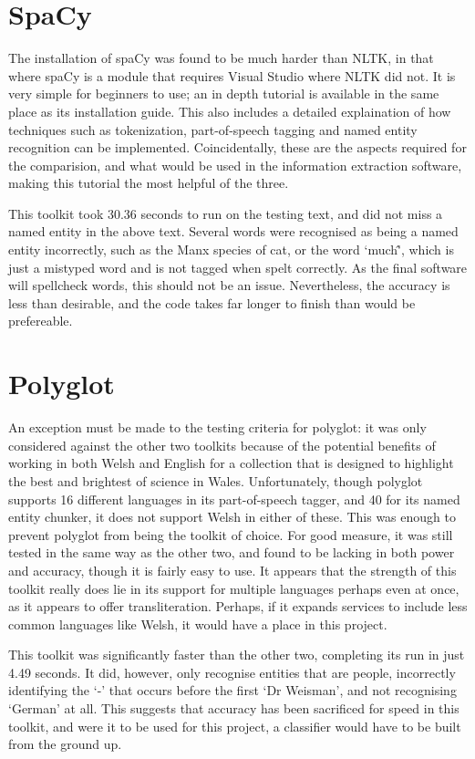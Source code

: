 \documentclass[11pt,a4paper]{article}
\begin{document}
\section{SpaCy}
The installation of spaCy was found to be much harder than NLTK, in that where spaCy is a module that requires Visual Studio where NLTK did not. 	It is very simple for beginners to use; an in depth tutorial is available in the same place as its installation guide. This also includes a detailed explaination of how techniques such as tokenization, part-of-speech tagging and named entity recognition can be implemented. Coincidentally, these are the aspects required for the comparision, and what would be used in the information extraction software, making this tutorial the most helpful of the three.

This toolkit took 30.36 seconds to run on the testing text, and did not miss a named entity in the above text. Several words were recognised as being a named entity incorrectly, such as the Manx species of cat, or the word `much\^', which is just a mistyped word and is not tagged when spelt correctly. As the final software will spellcheck words, this should not be an issue. Nevertheless, the accuracy is less than desirable, and the code takes far longer to finish than would be prefereable.

\section{Polyglot}
An exception must be made to the testing criteria for polyglot: it was only considered against the other two toolkits because of the potential benefits of working in both Welsh and English for a collection that is designed to highlight the best and brightest of science in Wales. Unfortunately, though polyglot supports 16 different languages in its part-of-speech tagger, and 40 for its named entity chunker, it does not support Welsh in either of these. This was enough to prevent polyglot from being the toolkit of choice. For good measure, it was still tested in the same way as the other two, and found to be lacking in both power and accuracy, though it is fairly easy to use. It appears that the strength of this toolkit really does lie in its support for multiple languages perhaps even at once, as it appears to offer transliteration. Perhaps, if it expands services to include less common languages like Welsh, it would have a place in this project.

This toolkit was significantly faster than the other two, completing its run in just 4.49 seconds. It did, however, only recognise entities that are people, incorrectly identifying the `-' that occurs before the first `Dr Weisman', and not recognising `German' at all. This suggests that accuracy has been sacrificed for speed in this toolkit, and were it to be used for this project, a classifier would have to be built from the ground up.
\end{document}
